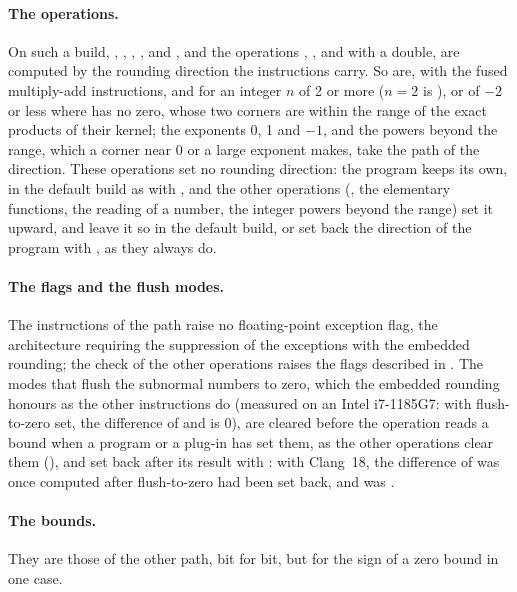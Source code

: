 \medskip
\paragraph{The operations.} On such a build, , ,
, ,  and , and the
operations \code{+}, \code{-}, \code{*} and \code{/} with a double, are
computed by the rounding direction the instructions carry. So are, with the fused multiply-add instructions,
 and  for an integer $n$ of 2 or more
($n=2$ is ), or of $-2$ or less where  has no zero,
whose two corners are within the range of the exact products of their kernel;
the exponents 0, 1 and $-1$, and the powers beyond the range, which a corner
near 0 or a large exponent makes, take the path of the direction. These
operations set no rounding direction: the program keeps its own, in the
default build as with , and the other
operations (\code{\%}, the elementary functions, the reading of a number, the
integer powers beyond the range) set it upward, and leave it so in the default
build, or set back the direction of the program with
, as they always do.

\medskip
\paragraph{The flags and the flush modes.} The instructions of the path raise no
floating-point exception flag, the architecture requiring the suppression of
the exceptions with the embedded rounding; the check of the other operations
raises the flags described in . The modes that flush
the subnormal numbers to zero, which the embedded rounding honours as the
other instructions do (measured on an Intel i7-1185G7: with flush-to-zero
set, the difference of  and  is 0), are cleared
before the operation reads a bound when a program or a plug-in has set them,
as the other operations clear them (), and set back after its
result with : with Clang~18, the difference
of  was once computed after flush-to-zero had been set back, and
\code{[3e-308] - [2.9e-308]} was .\newinvfive

\medskip
\paragraph{The bounds.} They are those of the other path, bit for bit, but for
the sign of a zero bound in one case.

